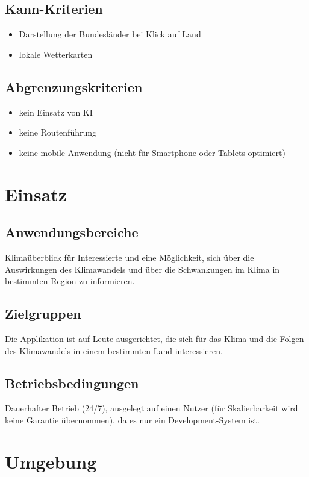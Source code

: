 \documentclass[a4paper]{scrreprt}
\begin{document}
\section{Kann-Kriterien}
\begin{itemize}
    \item Darstellung der Bundesländer bei Klick auf Land
    \item lokale Wetterkarten
\end{itemize}

\section{Abgrenzungskriterien}
\begin{itemize}
    \item kein Einsatz von KI
    \item keine Routenführung
    \item keine mobile Anwendung (nicht für Smartphone oder Tablets optimiert)
\end{itemize}

\chapter{Einsatz}
\section{Anwendungsbereiche}
Klimaüberblick für Interessierte und eine Möglichkeit, sich über die Auswirkungen des Klimawandels und über die Schwankungen im Klima in bestimmten Region zu informieren.

\section{Zielgruppen}
Die Applikation ist auf Leute ausgerichtet, die sich für das Klima und die Folgen des Klimawandels in einem bestimmten Land interessieren.

\section{Betriebsbedingungen}
Dauerhafter Betrieb (24/7), ausgelegt auf einen Nutzer (für Skalierbarkeit wird keine Garantie übernommen), da es nur ein Development-System ist.

\chapter{Umgebung}
\end{document}
